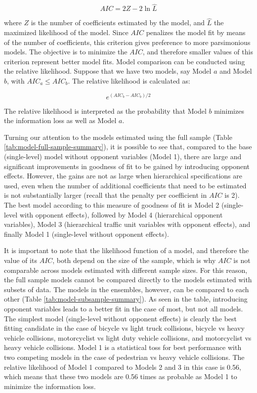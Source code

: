 \documentclass[]{elsarticle} %
\begin{document}
\begin{equation}
\label{eq:aic}
AIC = 2Z - 2\ln{\hat{L}}
\end{equation}

\noindent where \(Z\) is the number of coefficients estimated by the
model, and \(\hat{L}\) the maximized likelihood of the model. Since
\(AIC\) penalizes the model fit by means of the number of coefficients,
this criterion gives preference to more parsimonious models. The
objective is to minimize the \(AIC\), and therefore smaller values of
this criterion represent better model fits. Model comparison can be
conducted using the relative likelihood. Suppose that we have two
models, say Model \(a\) and Model \(b\), with \(AIC_{a} \le AIC_{b}\).
The relative likelihood is calculated as:

\begin{equation}
\label{eq:relative-likelihood}
e^{(AIC_b - AIC_b)/2}
\end{equation}

The relative likelihood is interpreted as the probability that Model
\(b\) minimizes the information loss as well as Model \(a\).

Turning our attention to the models estimated using the full sample
(Table \ref{tab:model-full-sample-summary}), it is possible to see that,
compared to the base (single-level) model without opponent variables
(Model 1), there are large and significant improvements in goodness of
fit to be gained by introducing opponent effects. However, the gains are
not as large when hierarchical specifications are used, even when the
number of additional coefficients that need to be estimated is not
substantially larger (recall that the penalty per coefficient in \(AIC\)
is 2). The best model according to this measure of goodness of fit is
Model 2 (single-level with opponent effects), followed by Model 4
(hierarchical opponent variables), Model 3 (hierarchical traffic unit
variables with opponent effects), and finally Model 1 (single-level
without opponent effects).

It is important to note that the likelihood function of a model, and
therefore the value of its \(AIC\), both depend on the size of the
sample, which is why \(AIC\) is not comparable across models estimated
with different sample sizes. For this reason, the full sample models
cannot be compared directly to the models estimated with subsets of
data. The models in the ensembles, however, can be compared to each
other (Table \ref{tab:model-subsample-summary}). As seen in the table,
introducing opponent variables leads to a better fit in the case of
most, but not all models. The simplest model (single-level without
opponent effects) is clearly the best fitting candidate in the case of
bicycle vs light truck collisions, bicycle vs heavy vehicle collisions,
motorcyclist vs light duty vehicle collisions, and motorcyclist vs heavy
vehicle collisions. Model 1 is a statistical toss for best performance
with two competing models in the case of pedestrian vs heavy vehicle
collisions. The relative likelihood of Model 1 compared to Models 2 and
3 in this case is 0.56, which means that these two models are 0.56 times
as probable as Model 1 to minimize the information loss.
\end{document}
